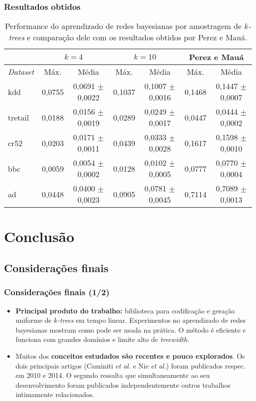 \documentclass{beamer}
\begin{document}
  \begin{frame}
    \frametitle{Resultados obtidos}

    \begin{table}
      \centering

      {\tiny
        \begin{tabular}{l c c c c c c} \hline
          & \multicolumn{2}{c}{$k = 4$} & \multicolumn{2}{c}{$k = 10$} & \multicolumn{2}{c}{Perez e Mauá} \\ \hline
          \emph{Dataset} & Máx. & Média & Máx. & Média & Máx. & Média \\ \hline
          kdd & 0,0755 & 0,0691 $\pm$ 0,0022 & 0,1037 & 0,1007 $\pm$ 0,0016 & 0,1468 & 0,1447 $\pm$ 0,0007 \\
          tretail & 0,0188 & 0,0156 $\pm$ 0,0019 & 0,0289 & 0,0249 $\pm$ 0,0017 & 0,0447 & 0,0444 $\pm$ 0,0002 \\
          cr52 & 0,0203 & 0,0171 $\pm$ 0,0011 & 0,0439 & 0,0333 $\pm$ 0,0028 & 0,1617 & 0,1598 $\pm$ 0,0010 \\
          bbc & 0,0059 & 0,0054 $\pm$ 0,0002 & 0,0128 & 0,0102 $\pm$ 0,0005 & 0,0777 & 0,0770 $\pm$ 0,0004 \\
          ad & 0,0448 & 0,0400 $\pm$ 0,0023 & 0,0905 & 0,0781 $\pm$ 0,0045 & 0,7114 & 0,7089 $\pm$ 0,0013 \\ \hline
        \end{tabular}
      }

      \caption{Performance do aprendizado de redes bayesianas por amostragem de \emph{$k$-trees} e comparação dele com os resultados obtidos por Perez e Mauá.}
      \label{tab:comparacao}
    \end{table}
  \end{frame}

  \section{Conclusão}

  \subsection{Considerações finais}

  \begin{frame}
    \frametitle{Considerações finais (1/2)}

    \begin{itemize}
      \item \textbf{Principal produto do trabalho:} biblioteca para codificação e geração uniforme de \emph{$k$-trees} em tempo linear. Experimentos no aprendizado de redes bayesianas mostram como pode ser usada na prática. O método é eficiente e funciona com grandes domínios e limite alto de \emph{treewidth}.
      \item Muitos dos \textbf{conceitos estudados são recentes e pouco explorados}. Os dois principais artigos (Caminiti \emph{et al.} e Nie \emph{et al.}) foram publicados respec. em 2010 e 2014. O segundo ressalta que simultaneamente ao seu desenvolvimento foram publicados independentemente outros trabalhos intimamente relacionados.
    \end{itemize}
  \end{frame}
\end{document}
